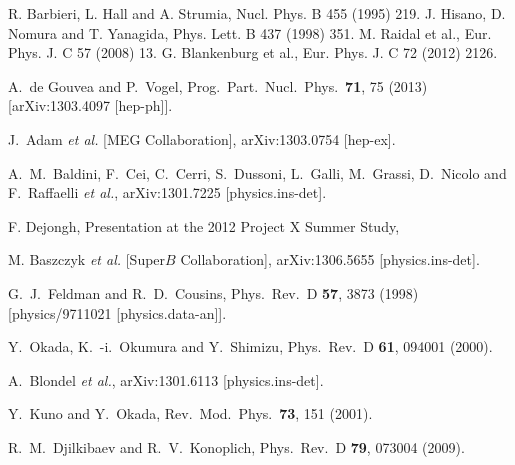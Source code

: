 \begin{thebibliography}{9}

  R. Barbieri, L. Hall and A. Strumia, Nucl. Phys. B 455
(1995) 219.
J. Hisano, D. Nomura and T. Yanagida, Phys. Lett.
B 437 (1998) 351.
M. Raidal et al., Eur. Phys. J. C 57 (2008) 13.
G. Blankenburg et al., Eur. Phys. J. C 72 (2012) 2126.

  A.~de Gouvea and P.~Vogel,
  Prog.\ Part.\ Nucl.\ Phys.\  {\bf 71}, 75 (2013)
  [arXiv:1303.4097 [hep-ph]].

 J.~Adam {\it et al.}  [MEG Collaboration],
  arXiv:1303.0754 [hep-ex].

 A.~M.~Baldini, F.~Cei, C.~Cerri, S.~Dussoni, L.~Galli, M.~Grassi, D.~Nicolo and F.~Raffaelli {\it et al.},
  arXiv:1301.7225 [physics.ins-det].

F. Dejongh, Presentation at the 2012 Project X Summer Study,
\hfill{}

M. Baszczyk {\it et al.} [Super$B$ Collaboration],
arXiv:1306.5655 [physics.ins-det].

  G.~J.~Feldman and R.~D.~Cousins,
  Phys.\ Rev.\ D {\bf 57}, 3873 (1998)
  [physics/9711021 [physics.data-an]].


   Y.~Okada, K.~-i.~Okumura and Y.~Shimizu, Phys.\ Rev.\ D {\bf 61}, 094001 (2000).

 A.~Blondel {\it et al.}, arXiv:1301.6113 [physics.ins-det].

 Y.~Kuno and Y.~Okada, Rev.\ Mod.\ Phys.\  {\bf 73}, 151 (2001).

 R.~M.~Djilkibaev and R.~V.~Konoplich, Phys.\ Rev.\ D {\bf 79}, 073004 (2009).

\end{thebibliography}
